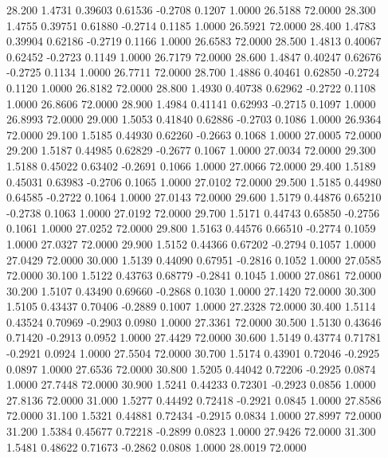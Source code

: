   28.200   1.4731   0.39603   0.61536  -0.2708   0.1207   1.0000  26.5188  72.0000
  28.300   1.4755   0.39751   0.61880  -0.2714   0.1185   1.0000  26.5921  72.0000
  28.400   1.4783   0.39904   0.62186  -0.2719   0.1166   1.0000  26.6583  72.0000
  28.500   1.4813   0.40067   0.62452  -0.2723   0.1149   1.0000  26.7179  72.0000
  28.600   1.4847   0.40247   0.62676  -0.2725   0.1134   1.0000  26.7711  72.0000
  28.700   1.4886   0.40461   0.62850  -0.2724   0.1120   1.0000  26.8182  72.0000
  28.800   1.4930   0.40738   0.62962  -0.2722   0.1108   1.0000  26.8606  72.0000
  28.900   1.4984   0.41141   0.62993  -0.2715   0.1097   1.0000  26.8993  72.0000
  29.000   1.5053   0.41840   0.62886  -0.2703   0.1086   1.0000  26.9364  72.0000
  29.100   1.5185   0.44930   0.62260  -0.2663   0.1068   1.0000  27.0005  72.0000
  29.200   1.5187   0.44985   0.62829  -0.2677   0.1067   1.0000  27.0034  72.0000
  29.300   1.5188   0.45022   0.63402  -0.2691   0.1066   1.0000  27.0066  72.0000
  29.400   1.5189   0.45031   0.63983  -0.2706   0.1065   1.0000  27.0102  72.0000
  29.500   1.5185   0.44980   0.64585  -0.2722   0.1064   1.0000  27.0143  72.0000
  29.600   1.5179   0.44876   0.65210  -0.2738   0.1063   1.0000  27.0192  72.0000
  29.700   1.5171   0.44743   0.65850  -0.2756   0.1061   1.0000  27.0252  72.0000
  29.800   1.5163   0.44576   0.66510  -0.2774   0.1059   1.0000  27.0327  72.0000
  29.900   1.5152   0.44366   0.67202  -0.2794   0.1057   1.0000  27.0429  72.0000
  30.000   1.5139   0.44090   0.67951  -0.2816   0.1052   1.0000  27.0585  72.0000
  30.100   1.5122   0.43763   0.68779  -0.2841   0.1045   1.0000  27.0861  72.0000
  30.200   1.5107   0.43490   0.69660  -0.2868   0.1030   1.0000  27.1420  72.0000
  30.300   1.5105   0.43437   0.70406  -0.2889   0.1007   1.0000  27.2328  72.0000
  30.400   1.5114   0.43524   0.70969  -0.2903   0.0980   1.0000  27.3361  72.0000
  30.500   1.5130   0.43646   0.71420  -0.2913   0.0952   1.0000  27.4429  72.0000
  30.600   1.5149   0.43774   0.71781  -0.2921   0.0924   1.0000  27.5504  72.0000
  30.700   1.5174   0.43901   0.72046  -0.2925   0.0897   1.0000  27.6536  72.0000
  30.800   1.5205   0.44042   0.72206  -0.2925   0.0874   1.0000  27.7448  72.0000
  30.900   1.5241   0.44233   0.72301  -0.2923   0.0856   1.0000  27.8136  72.0000
  31.000   1.5277   0.44492   0.72418  -0.2921   0.0845   1.0000  27.8586  72.0000
  31.100   1.5321   0.44881   0.72434  -0.2915   0.0834   1.0000  27.8997  72.0000
  31.200   1.5384   0.45677   0.72218  -0.2899   0.0823   1.0000  27.9426  72.0000
  31.300   1.5481   0.48622   0.71673  -0.2862   0.0808   1.0000  28.0019  72.0000
